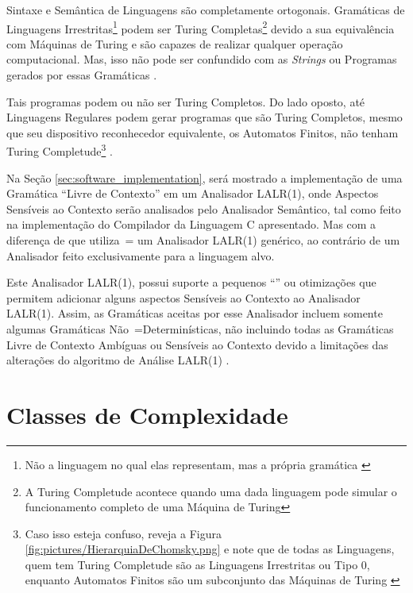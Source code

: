 {    Sintaxe e
    Semântica de Linguagens são completamente ortogonais.
    Gramáticas de Linguagens Irrestritas\footnote{
    Não a linguagem no qual elas representam,
    mas a própria gramática \cite{finiteAutomataTuringComplete}
    } podem ser Turing Completas\footnote{
    A Turing Completude acontece quando uma dada linguagem pode simular o funcionamento completo de uma Máquina de Turing } devido a sua equivalência com Máquinas de Turing e
    são capazes de realizar qualquer operação computacional.
    Mas,
    isso não pode ser confundido com as \textit{Strings} ou
    Programas gerados por essas Gramáticas \cite{areThereDomainSpecificLanguages}.

    Tais programas podem ou
    não ser Turing Completos.
    Do lado oposto,
    até Linguagens Regulares podem gerar programas que são Turing Completos,
    mesmo que seu dispositivo reconhecedor equivalente,
    os Automatos Finitos,
    não tenham Turing Completude\footnote{
    Caso isso esteja confuso,
    reveja a Figura \ref{fig:pictures/HierarquiaDeChomsky.png} e
    note que de todas as Linguagens,
    quem tem Turing Completude são as Linguagens Irrestritas ou
    Tipo 0,
    enquanto Automatos Finitos são um subconjunto das Máquinas de Turing \cite{finiteAutomataTuringComplete}
    } \cite{turingCompleteRegularLanguages,finiteAutomataTuringComplete}.

    Na Seção \ref{sec:software_implementation},
    será mostrado a implementação de uma Gramática ``Livre de Contexto'' em um Analisador LALR(1),
    onde Aspectos Sensíveis ao Contexto serão analisados pelo Analisador Semântico,
    tal como feito na implementação do Compilador da Linguagem C apresentado.
    Mas com a diferença de que utiliza~= um Analisador LALR(1) genérico,
    ao contrário de um Analisador feito exclusivamente para a linguagem alvo.

    Este Analisador LALR(1),
    possui suporte a pequenos ``\textit{}'' ou
    otimizações que permitem adicionar alguns aspectos Sensíveis ao Contexto ao Analisador LALR(1).
    Assim,
    as Gramáticas aceitas por esse Analisador incluem somente algumas Gramáticas Não~=Determinísticas,
    não incluindo todas as Gramáticas Livre de Contexto Ambíguas ou
    Sensíveis ao Contexto devido a limitações das alterações do algoritmo de Análise LALR(1) \cite{larkContextualLexer}.


\section{Classes de Complexidade}
\label{classesDeComplexidade}

}
